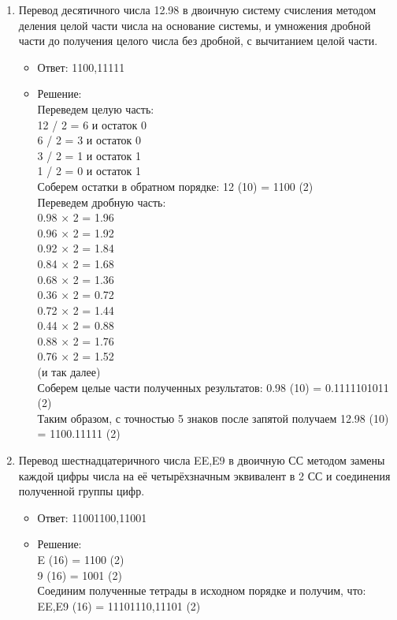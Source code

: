 \documentclass[14pt,final,oneside]{extreport}%
\begin{document}
\begin{enumerate}
        \item Перевод десятичного числа 12.98 в двоичную систему счисления методом деления целой части числа на основание системы, и умножения дробной части до получения целого числа без дробной, с вычитанием целой части.
        \begin{itemize}
            \item Ответ: 1100,11111
            \item Решение: \\
                Переведем целую часть: \\
                12 / 2 = 6 и остаток 0 \\
                6 / 2 = 3 и остаток 0 \\
                3 / 2 = 1 и остаток 1 \\
                1 / 2 = 0 и остаток 1 \\
                Соберем остатки в обратном порядке: 12 (10) = 1100 (2) \\
                Переведем дробную часть: \\
                0.98 × 2 = 1.96 \\
                0.96 × 2 = 1.92 \\
                0.92 × 2 = 1.84 \\
                0.84 × 2 = 1.68 \\ 
                0.68 × 2 = 1.36 \\
                0.36 × 2 = 0.72 \\
                0.72 × 2 = 1.44 \\
                0.44 × 2 = 0.88 \\
                0.88 × 2 = 1.76 \\
                0.76 × 2 = 1.52 \\
                (и так далее) \\
                Соберем целые части полученных результатов: 0.98 (10) = 0.1111101011 (2) \\
                Таким образом, с точностью 5 знаков после запятой получаем 	12.98 (10) = 1100.11111 (2) \\
        \end{itemize}

        \item Перевод шестнадцатеричного числа EE,E9 в двоичную СС методом замены каждой цифры числа на её четырёхзначным эквивалент в 2 СС и соединения полученной группы цифр.
        \begin{itemize}
            \item Ответ: 11001100,11001
            \item Решение: \\
                E (16) = 1100 (2) \\
                9 (16) = 1001 (2) \\
                Соединим полученные тетрады в исходном порядке и получим, что: EE,E9 (16) = 11101110,11101 (2)
        \end{itemize}


\end{enumerate}
\end{document}
